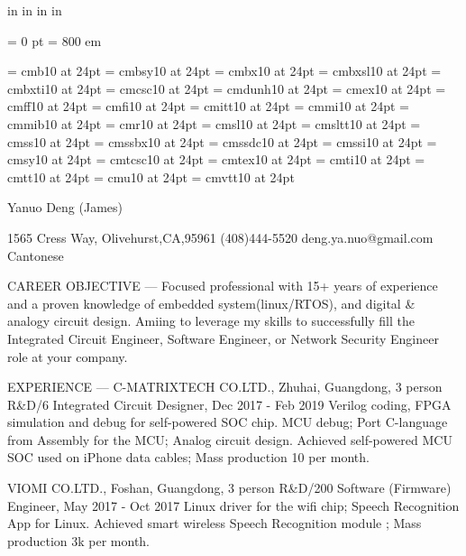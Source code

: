 \nopagenumbers

 in     %
 in    %
 in  %
 in  %

\parindent = 0 pt
\emergencystretch = 800 em


\font\FFcmb=      cmb10            at 24pt
\font\FFcmbsy=    cmbsy10          at 24pt
\font\FFcmbx=     cmbx10           at 24pt
\font\FFcmbxsl=   cmbxsl10         at 24pt
\font\FFcmbxti=   cmbxti10         at 24pt
\font\FFcmcsc=    cmcsc10          at 24pt
\font\FFcmdunh=   cmdunh10         at 24pt
\font\FFcmex=     cmex10           at 24pt
\font\FFcmff=     cmff10           at 24pt
\font\FFcmfi=     cmfi10           at 24pt
\font\FFcmitt=    cmitt10          at 24pt
\font\FFcmmi=     cmmi10           at 24pt
\font\FFcmmib=    cmmib10          at 24pt
\font\FFcmr=      cmr10            at 24pt
\font\FFcmsl=     cmsl10           at 24pt
\font\FFcmsltt=   cmsltt10         at 24pt
\font\FFcmss=     cmss10           at 24pt
\font\FFcmssbx=   cmssbx10         at 24pt
\font\FFcmssdc=   cmssdc10         at 24pt
\font\FFcmssi=    cmssi10          at 24pt
\font\FFcmsy=     cmsy10           at 24pt
\font\FFcmtcsc=   cmtcsc10         at 24pt
\font\FFcmtex=    cmtex10          at 24pt
\font\FFcmti=     cmti10           at 24pt
\font\FFcmtt=     cmtt10           at 24pt
\font\FFcmu=      cmu10            at 24pt
\font\FFcmvtt=    cmvtt10          at 24pt


\centerline{ \FFcmb
Yanuo Deng (James)
}

1565 Cress Way, Olivehurst,CA,95961
(408)444-5520
deng.ya.nuo@gmail.com
Cantonese

CAREER OBJECTIVE
---
Focused professional with 15+ years of experience and a proven knowledge of embedded system(linux/RTOS), and digital \& analogy circuit design. Amiing to leverage my skills to successfully fill the Integrated Circuit Engineer, Software Engineer, or Network Security Engineer role at your company.

EXPERIENCE
---
C-MATRIXTECH CO.LTD., Zhuhai, Guangdong, 3 person R\&D/6
Integrated Circuit Designer, Dec 2017 - Feb 2019
 Verilog coding, FPGA simulation and debug for self-powered SOC chip. 
 MCU debug; Port C-language from Assembly for the MCU; Analog circuit design.
 Achieved self-powered MCU SOC used on iPhone data cables; Mass production 10 per month.

VIOMI CO.LTD., Foshan, Guangdong, 3 person R\&D/200
Software (Firmware) Engineer, May 2017 - Oct 2017
 Linux driver for the wifi chip; Speech Recognition App for Linux.
 Achieved smart wireless Speech Recognition module ; Mass production 3k per month.

